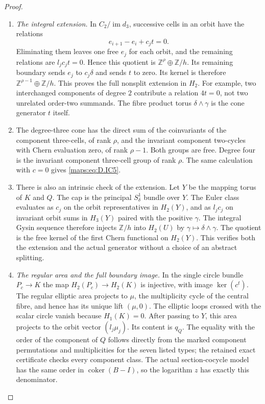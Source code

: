 \begin{proof}
\begin{enumerate}[label=\arabic*.,leftmargin=*]
\item \emph{The integral extension.}
In $C_2/\operatorname{im}d_3$, successive cells in an
orbit have the relations
\[
                  e_{i+1}-e_i+c_jt=0.
                                                        \tag{D.IC9}\label{maps:eq:D.IC9}
\]
Eliminating them leaves one free $e_j$ for each orbit,
and the remaining relations are $l_jc_jt=0$.
Hence this quotient is
$\mathbb Z^\rho\oplus\mathbb Z/h$.
Its remaining boundary sends $e_j$ to $c_j\delta$
and sends $t$ to zero. Its kernel is therefore
$\mathbb Z^{\rho-1}\oplus\mathbb Z/h$.
This proves the full nonsplit extension in $H_2$.
For example, two interchanged components of degree
$2$ contribute a relation $4t=0$, not two unrelated
order-two summands. The fibre product torus
$\delta\wedge\gamma$ is the cone generator $t$ itself.

\item The degree-three cone has the direct sum of the
coinvariants of the component three-cells, of rank
$\rho$, and the invariant component two-cycles with
Chern evaluation zero, of rank $\rho-1$.
Both groups are free. Degree four is the invariant
component three-cell group of rank $\rho$.
The same calculation with $c=0$ gives \eqref{maps:eq:D.IC5}.

\item There is also an intrinsic check of the extension.
Let $Y$ be the mapping torus of $K$ and $Q$.
The cap is the principal $S^1_\delta$ bundle over $Y$.
The Euler class evaluates as $c_j$ on the orbit
representatives in $H_2(Y)$, and as $l_jc_j$ on
invariant orbit sums in $H_3(Y)$ paired with the
positive $\gamma$. The integral Gysin sequence
therefore injects $\mathbb Z/h$ into $H_2(U)$ by
$\gamma\mapsto\delta\wedge\gamma$.
The quotient is the free kernel of the first Chern
functional on $H_2(Y)$. This verifies both the
extension and the actual generator without a
choice of an abstract splitting.

\item \emph{The regular area and the full boundary image.}
In the single circle bundle $P_c\to K$ the map
$H_2(P_c)\to H_2(K)$ is injective, with image
$\ker(c^t)$. The regular elliptic area projects to
$\mu$, the multiplicity cycle of the central fibre,
and hence has its unique lift $(\mu,0)$.
The elliptic loops crossed with the scalar circle
vanish because $H_1(K)=0$.
After passing to $Y$, this area projects to the
orbit vector $(l_j\mu_j)$. Its content is $q_Q$.
The equality with the order of the component of
$Q$ follows directly from the marked component
permutations and multiplicities for the seven listed
types; the retained exact certificate checks every
component class. The actual section-cocycle model
has the same order in $\operatorname{coker}(B-I)$,
so the logarithm $z$ has exactly this denominator.


\end{enumerate}
\end{proof}
